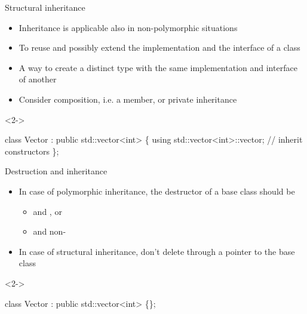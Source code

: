 \begin{frame}[fragile]{Structural inheritance}

  \begin{itemize}
  \item Inheritance is applicable also in non-polymorphic situations
  \item To reuse and possibly extend the implementation and the interface of a
    class
  \item A way to create a distinct type with the same implementation and
    interface of another
  \item<5-> Consider composition, i.e. a member, or private inheritance
  \end{itemize}

  \begin{codeblock}<2->{
class Vector : public std::vector<int> \{
  using std::vector<int>::vector; // inherit constructors
\};


}\end{codeblock}

\end{frame}

\begin{frame}[fragile]{Destruction and inheritance}
  \begin{itemize}
  \item In case of polymorphic inheritance, the destructor of a base class
    should be
    \begin{itemize}
    \item {} and , or
    \item {} and non-
    \end{itemize}
  \item<2-> In case of structural inheritance, don't delete through a
    pointer to the base class
  \end{itemize}

    \begin{codeblock}<2->{
class Vector : public std::vector<int> \{\};



}\end{codeblock}

\end{frame}

